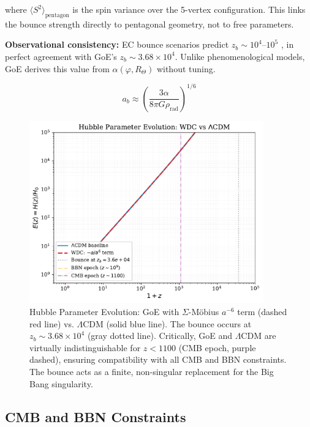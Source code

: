 \documentclass[12pt]{article}
\begin{document}
where $\langle S^2 \rangle_{\text{pentagon}}$ is the spin variance over the 5-vertex configuration. This links the bounce strength directly to pentagonal geometry, not to free parameters.

\textbf{Observational consistency:} EC bounce scenarios predict $z_b \sim 10^4$--$10^5$ \cite{poplawski2010,magueijo2013}, in perfect agreement with GoE's $z_b \sim 3.68 \times 10^4$. Unlike phenomenological models, GoE derives this value from $\alpha(\varphi, R_\Theta)$ without tuning.

\begin{equation}
a_b \approx \left(\frac{3\alpha}{8\pi G \rho_{\text{rad}}}\right)^{1/6}
\end{equation}

\begin{figure}[H]
\centering
\includegraphics[width=0.9\textwidth]{figures/fig_Hz_bounce.pdf}
\caption{Hubble Parameter Evolution: GoE with $\Sigma$-M\"obius $a^{-6}$ term (dashed red line) vs. $\Lambda$CDM (solid blue line). The bounce occurs at $z_b \sim 3.68 \times 10^4$ (gray dotted line). Critically, GoE and $\Lambda$CDM are virtually indistinguishable for $z < 1100$ (CMB epoch, purple dashed), ensuring compatibility with all CMB and BBN constraints. The bounce acts as a finite, non-singular replacement for the Big Bang singularity.}
\label{fig:bounce_comparison}
\end{figure}

\subsection{CMB and BBN Constraints}
\end{document}
